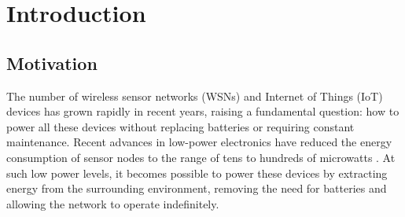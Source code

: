 


\chapter{Introduction}

\section{Motivation}

The number of wireless sensor networks (WSNs) and Internet 
of Things (IoT) devices has grown rapidly in recent years, 
raising a fundamental question: how to power all these 
devices without replacing batteries or requiring constant 
maintenance. Recent advances in low-power electronics have 
reduced the energy consumption of sensor nodes to the range 
of tens to hundreds of microwatts 
\cite{roundyStudyLowLevel2003a}. At such low power levels, 
it becomes possible to power these devices by extracting 
energy from the surrounding environment, removing the need 
for batteries and allowing the network to operate 
indefinitely.


